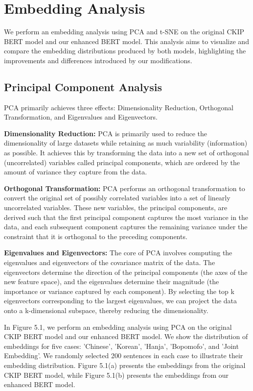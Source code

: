 \documentclass[PhD]{PHlab-thesis}
\begin{document}
\section{Embedding Analysis}
We perform an embedding analysis using PCA and t-SNE on the original CKIP BERT model and our enhanced BERT model. This analysis aims to visualize and compare the embedding distributions produced by both models, highlighting the improvements and differences introduced by our modifications.

\subsection{Principal Component Analysis}
PCA primarily achieves three effects: Dimensionality Reduction, Orthogonal Transformation, and Eigenvalues and Eigenvectors.

\textbf{Dimensionality Reduction:} PCA is primarily used to reduce the dimensionality of large datasets while retaining as much variability (information) as possible. It achieves this by transforming the data into a new set of orthogonal (uncorrelated) variables called principal components, which are ordered by the amount of variance they capture from the data.

\textbf{Orthogonal Transformation:} PCA performs an orthogonal transformation to convert the original set of possibly correlated variables into a set of linearly uncorrelated variables. These new variables, the principal components, are derived such that the first principal component captures the most variance in the data, and each subsequent component captures the remaining variance under the constraint that it is orthogonal to the preceding components.

\textbf{Eigenvalues and Eigenvectors:} The core of PCA involves computing the eigenvalues and eigenvectors of the covariance matrix of the data. The eigenvectors determine the direction of the principal components (the axes of the new feature space), and the eigenvalues determine their magnitude (the importance or variance captured by each component). By selecting the top k eigenvectors corresponding to the largest eigenvalues, we can project the data onto a k-dimensional subspace, thereby reducing the dimensionality.

In Figure 5.1, we perform an embedding analysis using PCA on the original CKIP BERT model and our enhanced BERT model. We show the distribution of embeddings for five cases: 'Chinese', 'Korean', 'Hanja', 'Bopomofo', and 'Joint Embedding'. We randomly selected 200 sentences in each case to illustrate their embedding distribution. Figure 5.1(a) presents the embeddings from the original CKIP BERT model, while Figure 5.1(b) presents the embeddings from our enhanced BERT model.
\end{document}
